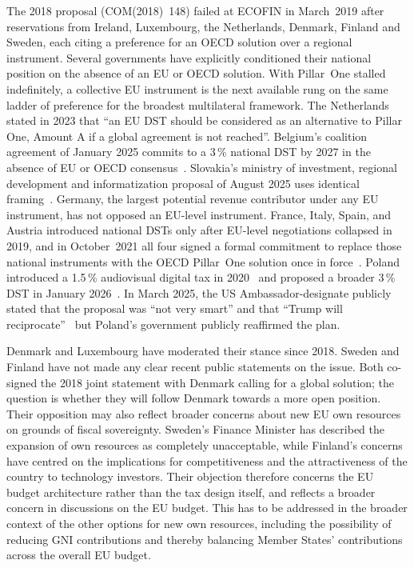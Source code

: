 \documentclass[../../main]{subfiles}
\begin{document}
The 2018 proposal (COM(2018)~148) failed at ECOFIN in March~2019 after reservations from Ireland, Luxembourg, the Netherlands, Denmark, Finland and Sweden, each citing a preference for an OECD solution over a regional instrument.
Several governments have explicitly conditioned their national position on the absence of an EU or OECD solution.
With Pillar~One stalled indefinitely, a collective EU instrument is the next available rung on the same ladder of preference for the broadest multilateral framework.
The Netherlands stated in 2023 that ``an EU DST should be considered as an alternative to Pillar One, Amount A if a global agreement is not reached''.
Belgium's coalition agreement of January 2025 commits to a 3\,\% national DST by 2027 in the absence of EU or OECD consensus~\citep{tax_foundation_dst_tracker_2026}.
Slovakia's ministry of investment, regional development and informatization proposal of August 2025 uses identical framing~\citep{mirri_slovakia_dst_2025}.
Germany, the largest potential revenue contributor under any EU instrument, has not opposed an EU-level instrument.
France, Italy, Spain, and Austria introduced national DSTs only after EU-level negotiations collapsed in 2019, and in October~2021 all four signed a formal commitment to replace those national instruments with the OECD Pillar~One solution once in force~\citep{joint_statement_oct2021}.
Poland introduced a 1.5\,\% audiovisual digital tax in 2020~\citep{tax_foundation_dst_tracker_2026} and proposed a broader 3\,\% DST in January 2026~\citep{poland_ud385_2026}.
In March 2025, the US Ambassador-designate publicly stated that the proposal was ``not very smart'' and that ``Trump will reciprocate''~\citep{euronews_dst_us_pressure_mar2025} but Poland's government publicly reaffirmed the plan.


Denmark and Luxembourg have moderated their stance since 2018.
Sweden and Finland have not made any clear recent public statements on the issue. Both co-signed the 2018 joint statement with Denmark calling for a global solution; the question is whether they will follow Denmark towards a more open position.
Their opposition may also reflect broader concerns about new EU own resources on grounds of fiscal sovereignty.
Sweden's Finance Minister has described the expansion of own resources as completely unacceptable, while Finland's concerns have centred on the implications for competitiveness and the attractiveness of the country to technology investors.
Their objection therefore concerns the EU budget architecture rather than the tax design itself, and reflects a broader concern in discussions on the EU budget.
This has to be addressed in the broader context of the other options for new own resources, including the possibility of reducing GNI contributions and thereby balancing Member States' contributions across the overall EU budget.
\end{document}
